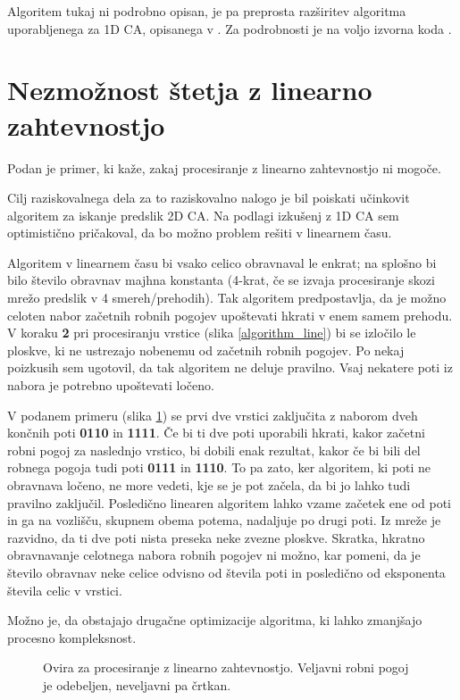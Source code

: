 \documentclass[12pt,a4paper,openany,twoside]{book}
\begin{document}
Algoritem tukaj ni podrobno opisan, je pa preprosta razširitev algoritma uporabljenega
za 1D CA, opisanega v \cite{JerasDobnikar2007}. Za podrobnosti je na voljo izvorna koda \cite{Jeras2016-algirithm}.

\section{Nezmožnost štetja z linearno zahtevnostjo}

Podan je primer, ki kaže, zakaj procesiranje z linearno zahtevnostjo ni mogoče.

Cilj raziskovalnega dela za to raziskovalno nalogo je bil poiskati
učinkovit algoritem za iskanje predslik 2D CA. Na podlagi izkušenj z 1D CA
sem optimistično pričakoval, da bo možno problem rešiti v linearnem času.

Algoritem v linearnem času bi vsako celico obravnaval le enkrat;
na splošno bi bilo število obravnav majhna konstanta (4-krat,
če se izvaja procesiranje skozi mrežo predslik v 4 smereh/prehodih).
Tak algoritem predpostavlja, da je možno celoten nabor začetnih
robnih pogojev upoštevati hkrati v enem samem prehodu.
V koraku \textbf{2} pri procesiranju vrstice (slika \ref{algorithm_line})
bi se izločilo le ploskve, ki ne ustrezajo nobenemu od začetnih robnih pogojev.
Po nekaj poizkusih sem ugotovil, da tak algoritem ne deluje pravilno.
Vsaj nekatere poti iz nabora je potrebno upoštevati ločeno.

V podanem primeru (slika \ref{algorithm_issue}) se prvi dve vrstici zaključita z
naborom dveh končnih poti \textbf{0110} in \textbf{1111}. Če bi ti dve poti
uporabili hkrati, kakor začetni robni pogoj za naslednjo vrstico, bi dobili
enak rezultat, kakor če bi bili del robnega pogoja tudi poti \textbf{0111} in \textbf{1110}.
To pa zato, ker algoritem, ki poti ne obravnava ločeno, ne more vedeti,
kje se je pot začela, da bi jo lahko tudi pravilno zaključil.
Posledično linearen algoritem lahko vzame začetek ene od poti in ga
na vozlišču, skupnem obema potema, nadaljuje po drugi poti.
Iz mreže je razvidno, da ti dve poti nista preseka neke zvezne ploskve.
Skratka, hkratno obravnavanje celotnega nabora robnih pogojev ni možno,
kar pomeni, da je število obravnav neke celice odvisno od števila poti
in posledično od eksponenta števila celic v vrstici.

Možno je, da obstajajo drugačne optimizacije algoritma, ki lahko zmanjšajo procesno kompleksnost.

\begin{figure}[htb]
\centerline{}
\caption[Ovira za procesiranje z linearno zahtevnostjo.]
{Ovira za procesiranje z linearno zahtevnostjo.
Veljavni robni pogoj je odebeljen, neveljavni pa črtkan.}
\label{algorithm_issue}
\end{figure}
\end{document}
